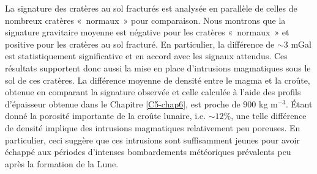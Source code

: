 La signature des  cratères au sol fracturés est  analysée en parallèle
de  celles de  nombreux cratères  « normaux » pour  comparaison.  Nous
montrons que  la signature  gravitaire moyenne  est négative  pour les
cratères « normaux » et positive pour les cratères au sol fracturé. En
particulier,  la  différence  de  $\sim 3$  mGal  est  statistiquement
significative et en  accord avec les signaux  attendus.  Ces résultats
supportent donc aussi  la mise en place  d’intrusions magmatiques sous
le sol  de ces  cratères. La  différence moyenne  de densité  entre le
magma  et la  croûte, obtenue  en comparant  la signature  observée et
celle  calculée  à l’aide  des  profils  d’épaisseur obtenue  dans  le
Chapitre \ref{C5-chap6}, est proche de  $900$ kg m$^{-3}$. Étant donné
la porosité  importante de  la croûte lunaire,  i.e. $\sim  12\%$, une
telle  différence  de  densité  implique  des  intrusions  magmatiques
relativement  peu  poreuses.  En  particulier,  ceci  suggère que  ces
intrusions sont  suffisamment jeunes  pour avoir échappé  aux périodes
d’intenses bombardements météoriques prévalents peu après la formation
de la Lune.

